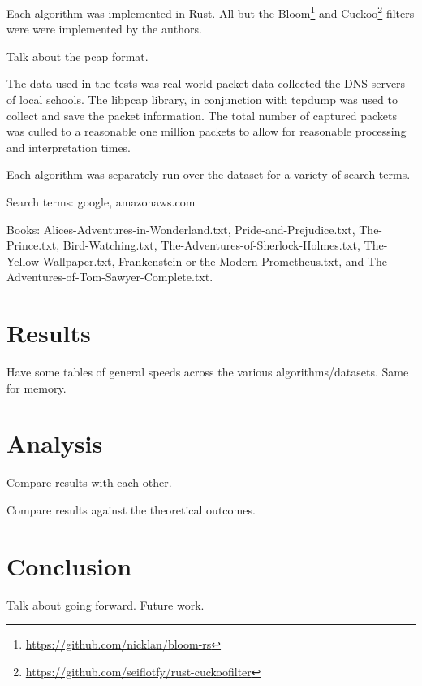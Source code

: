 \documentclass{article}
\begin{document}
Each algorithm was implemented in Rust. All but the Bloom\footnote{\url{https://github.com/nicklan/bloom-rs}} \cite{Bloom1970} and Cuckoo\footnote{\url{https://github.com/seiflotfy/rust-cuckoofilter}} \cite{Fan2014} filters were were implemented by the authors.

Talk about the pcap format.

The data used in the tests was real-world packet data collected the DNS servers of local schools. The libpcap library, in conjunction with tcpdump was used to collect and save the packet information. The total number of captured packets was culled to a reasonable one million packets to allow for reasonable processing and interpretation times.

Each algorithm was separately run over the dataset for a variety of search terms.

Search terms: google, amazonaws.com

Books: Alices-Adventures-in-Wonderland.txt, Pride-and-Prejudice.txt, The-Prince.txt, Bird-Watching.txt, The-Adventures-of-Sherlock-Holmes.txt, The-Yellow-Wallpaper.txt, Frankenstein-or-the-Modern-Prometheus.txt, and The-Adventures-of-Tom-Sawyer-Complete.txt.

\section{Results}
Have some tables of general speeds across the various algorithms/datasets. Same for memory.

\section{Analysis}
Compare results with each other.

Compare results against the theoretical outcomes.

\section{Conclusion}
Talk about going forward. Future work.
\nocite{*}




\end{document}

